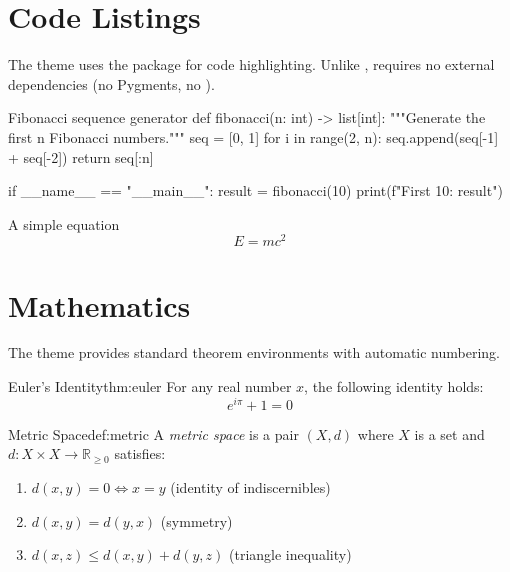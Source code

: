 \documentclass[11pt, a4paper]{article}
\begin{document}

\section{Code Listings}

The  theme uses the  package for code highlighting.
Unlike ,  requires no external dependencies (no
Pygments, no ).

\begin{codelisting}[Python]{Fibonacci sequence generator}
def fibonacci(n: int) -> list[int]:
    """Generate the first n Fibonacci numbers."""
    seq = [0, 1]
    for i in range(2, n):
        seq.append(seq[-1] + seq[-2])
    return seq[:n]

if __name__ == "__main__":
    result = fibonacci(10)
    print(f"First 10: {result}")
\end{codelisting}

\begin{codelisting}[TeX]{A simple equation}
\begin{equation}
  E = mc^2
  \label{eq:einstein}
\end{equation}
\end{codelisting}


\section{Mathematics}

The theme provides standard theorem environments with automatic numbering.

\begin{theorem}{Euler's Identity}{thm:euler}
  For any real number $x$, the following identity holds:
  \[
    e^{i\pi} + 1 = 0
  \]
\end{theorem}

\begin{definition}{Metric Space}{def:metric}
  A \emph{metric space} is a pair $(X, d)$ where $X$ is a set and
  $d\colon X \times X \to \mathbb{R}_{\geq 0}$ satisfies:
  \begin{enumerate}
    \item $d(x, y) = 0 \iff x = y$ (identity of indiscernibles)
    \item $d(x, y) = d(y, x)$ (symmetry)
    \item $d(x, z) \leq d(x, y) + d(y, z)$ (triangle inequality)
  \end{enumerate}
\end{definition}
\end{document}
